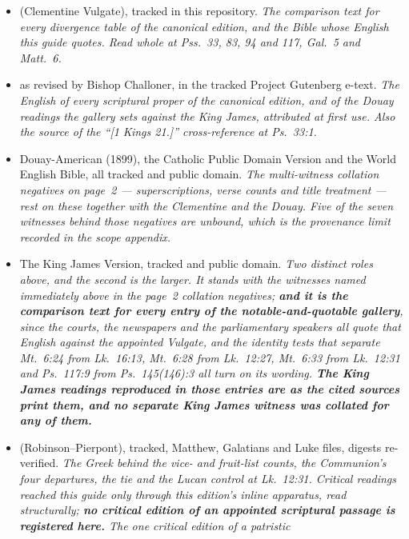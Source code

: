 \begin{itemize}[leftmargin=1.2em, itemsep=0.15em]
\item {} (Clementine Vulgate), tracked in
this repository. \textit{The comparison text for every divergence table of the
canonical edition, and the Bible whose English this guide quotes. Read whole at
Pss.~33, 83, 94 and 117, Gal.~5 and Matt.~6.}
\item {} as revised by Bishop Challoner, in
the tracked Project Gutenberg e-text. \textit{The English of every scriptural
proper of the canonical edition, and of the Douay readings the gallery sets
against the King James, attributed at first use. Also the source of the
``[1 Kings 21.]'' cross-reference at Ps.~33:1.}
\item Douay-American (1899), the Catholic Public Domain Version and the World
English Bible, all tracked and public domain. \textit{The multi-witness
collation negatives on page~2 --- superscriptions, verse counts and title
treatment --- rest on these together with the Clementine and the Douay. Five of
the seven witnesses behind those negatives are unbound, which is the provenance
limit recorded in the scope appendix.}
\item The King James Version, tracked and public domain. \textit{Two distinct
roles above, and the second is the larger. It stands with the witnesses named
immediately above in the page~2 collation negatives; \textbf{and it is the
comparison text for every entry of the notable-and-quotable gallery}, since the
courts, the newspapers and the parliamentary speakers all quote that English
against the appointed Vulgate, and the identity tests that separate Mt.\ 6:24
from Lk.\ 16:13, Mt.\ 6:28 from Lk.\ 12:27, Mt.\ 6:33 from Lk.\ 12:31 and
Ps.\ 117:9 from Ps.\ 145(146):3 all turn on its wording. \textbf{The King James
readings reproduced in those entries are as the cited sources print them, and no
separate King James witness was collated for any of them.}}
\item {}
(Robinson--Pierpont), tracked, Matthew, Galatians and Luke files, digests
re-verified. \textit{The Greek behind the vice- and fruit-list counts, the
Communion's four departures, the  tie and the Lucan control
at Lk.\ 12:31. Critical readings reached this guide only through this edition's
inline apparatus, read structurally; \textbf{no critical edition of an appointed
scriptural passage is registered here.} The one critical edition of a patristic
}
\end{itemize}
